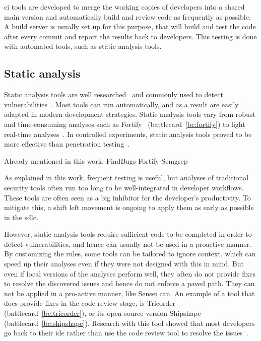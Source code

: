 \Gls{ci} tools are developed to merge the working copies of developers into a shared main version and automatically build and review code as frequently as possible.
A build server is usually set up for this purpose, that will build and test the code after every commit and report the results back to developers.
This testing is done with automated tools, such as static analysis tools.

\subsection{Static analysis}
Static analysis tools are well researched~\cite{li2017static,jovanovic2006pixy,livshits2005finding} and commonly used to detect vulnerabilities~\cite{cruzes2017security,bsimm9,bsimm11}.
Most tools can run automatically, and as a result are easily adapted in modern development strategies.
Static analysis tools vary from robust and time-consuming analyses such as Fortify~\cite{chess2004static} (battlecard~\ref{bc:fortify}) to light real-time analyses~\cite{brown2016build}.
In controlled experiments, static analysis tools proved to be more effective than penetration testing~\cite{Scandariato2013}.

Already mentioned in this work:
FindBugs
Fortify
Semgrep

As explained in this work, frequent testing is useful, but analyses of traditional security tools often run too long to be well-integrated in developer workflows.
These tools are often seen as a big inhibitor for the developer's productivity.
To mitigate this, a shift left movement is ongoing to apply them as early as possible in the \gls{sdlc}.

However, static analysis tools require sufficient code to be completed in order to detect vulnerabilities, and hence can usually not be used in a proactive manner.
By customizing the rules, some tools can be tailored to ignore context, which can speed up their analyses even if they were not designed with this in mind.
But even if local versions of the analyses perform well, they often do not provide fixes to resolve the discovered issues and hence do not enforce a paved path.
They can not be applied in a pro-active manner, like Sensei can.
An example of a tool that does provide fixes in the code review stage, is Tricorder~\cite{sadowski2015tricorder} (battlecard~\ref{bc:tricorder}), or its open-source version Shipshape (battlecard~\ref{bc:shipshape}).
Research with this tool showed that most developers go back to their \gls{ide} rather than use the code review tool to resolve the issues~\cite{sadowski2015tricorder}.

